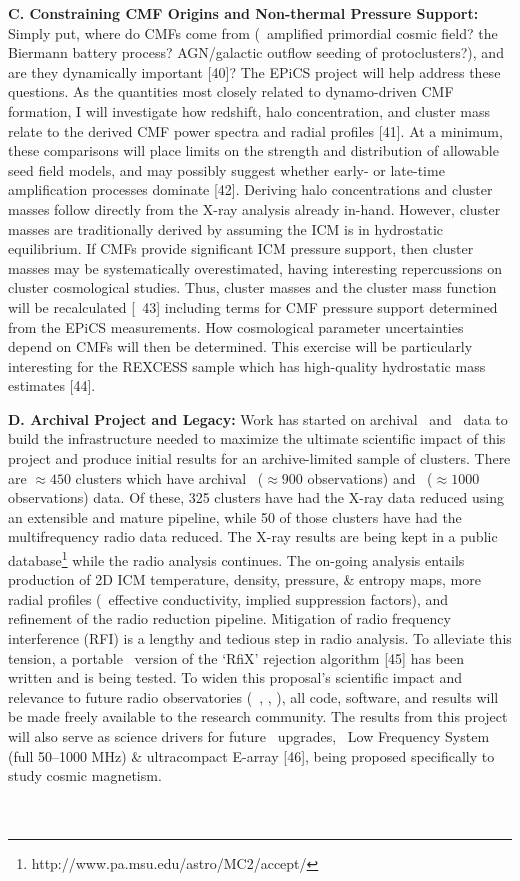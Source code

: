 \documentclass[12pt]{article}
\begin{document}
{\bf{C. Constraining CMF Origins and Non-thermal Pressure Support:}}
Simply put, where do CMFs come from (\eg\ amplified primordial cosmic
field?  the Biermann battery process?  AGN/galactic outflow seeding of
protoclusters?), and are they dynamically important [40]? The EPiCS
project will help address these questions. As the quantities most
closely related to dynamo-driven CMF formation, I will investigate how
redshift, halo concentration, and cluster mass relate to the derived
CMF power spectra and radial profiles [41]. At a minimum, these
comparisons will place limits on the strength and distribution of
allowable seed field models, and may possibly suggest whether early-
or late-time amplification processes dominate [42]. Deriving halo
concentrations and cluster masses follow directly from the X-ray
analysis already in-hand. However, cluster masses are traditionally
derived by assuming the ICM is in hydrostatic equilibrium. If CMFs
provide significant ICM pressure support, then cluster masses may be
systematically overestimated, having interesting repercussions on
cluster cosmological studies. Thus, cluster masses and the cluster
mass function will be recalculated [\eg\ 43] including terms for CMF
pressure support determined from the EPiCS measurements. How
cosmological parameter uncertainties depend on CMFs will then be
determined. This exercise will be particularly interesting for the
REXCESS sample which has high-quality hydrostatic mass estimates [44].

{\bf{D. Archival Project and Legacy:}} Work has started on archival
\chandra\ and \vla\ data to build the infrastructure needed to
maximize the ultimate scientific impact of this project and produce
initial results for an archive-limited sample of clusters. There are
$\approx 450$ clusters which have archival \chandra\ ($\approx 900$
observations) and \vla\ ($\approx 1000$ observations) data. Of these,
325 clusters have had the X-ray data reduced using an extensible and
mature pipeline, while 50 of those clusters have had the
multifrequency radio data reduced. The X-ray results are being kept in
a public database\footnote{http://www.pa.msu.edu/astro/MC2/accept/}
while the radio analysis continues. The on-going analysis entails
production of 2D ICM temperature, density, pressure, \& entropy maps,
more radial profiles (\eg\ effective conductivity, implied suppression
factors), and refinement of the radio reduction pipeline. Mitigation
of radio frequency interference (RFI) is a lengthy and tedious step in
radio analysis. To alleviate this tension, a portable \python\ version
of the `RfiX' rejection algorithm [45] has been written and is being
tested. To widen this proposal's scientific impact and relevance to
future radio observatories (\eg\ \lofar, \lwa, \ska), all code,
software, and results will be made freely available to the research
community. The results from this project will also serve as science
drivers for future \evla\ upgrades, \ie\ Low Frequency System (full
50--1000 MHz) \& ultracompact E-array [46], being proposed
specifically to study cosmic magnetism.\\

\\



\\




\end{document}
